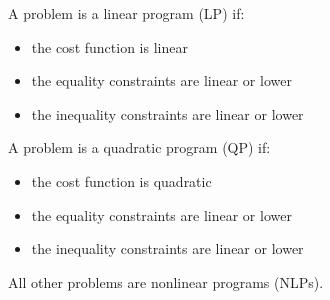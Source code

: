 A problem is a linear program (LP) if:
\begin{itemize}
  \item the cost function is linear
  \item the equality constraints are linear or lower
  \item the inequality constraints are linear or lower
\end{itemize}

A problem is a quadratic program (QP) if:
\begin{itemize}
  \item the cost function is quadratic
  \item the equality constraints are linear or lower
  \item the inequality constraints are linear or lower
\end{itemize}

All other problems are nonlinear programs (NLPs).
